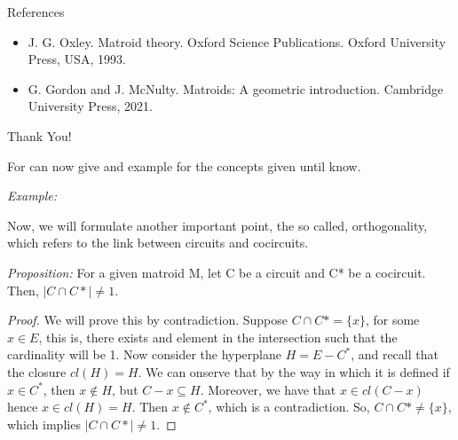 \documentclass{beamer}
\begin{document}
\begin{frame}{References}
\begin{itemize}[<+->]
    \item  J. G. Oxley. Matroid theory. Oxford Science Publications. Oxford University Press, USA, 1993.  
    \item G. Gordon and J. McNulty. Matroids: A geometric introduction. Cambridge University Press, 2021.

\end{itemize}
  
\end{frame}



\begin{frame}{}

\begin{center}
\huge Thank You!
\end{center}
    
\end{frame}


For can now give and example for the concepts given until know.

\textit{Example:}




Now, we will formulate another important point, the so called, orthogonality, which refers to the link between circuits and cocircuits. 

\textit{Proposition:} For a given matroid M, let C be a circuit and C* be a cocircuit. Then,  
$|C \cap C*| \neq 1$.

\begin{proof}
    We will prove this by contradiction. Suppose $C \cap C* = \{x\}$, for some $x \in E$, this is, there exists and element in the intersection such that the cardinality will be 1. Now consider the hyperplane $H=E-C^*$, and recall that the closure $cl(H)=H$. We can onserve that by the way in which it is defined if $x\in C^*$, then $x\notin H$, but $C-x\subseteq H$. Moreover, we have that $x\in cl(C-x)$ hence $x\in cl(H)=H$. Then $x\notin C^*$, which is a contradiction. So, $C \cap C* \neq \{x\}$, which implies $|C \cap C*| \neq 1$.
\end{proof}
\end{document}
